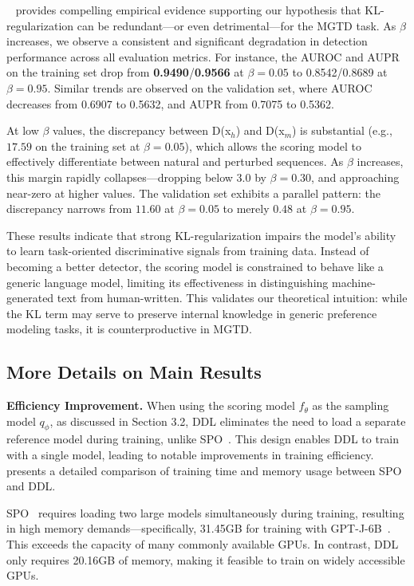 \documentclass[sigconf, screen, review, anonymous]{acmart}
\begin{document}
~ provides compelling empirical evidence supporting our hypothesis that KL-regularization can be redundant—or even detrimental—for the MGTD task. As $\beta$ increases, we observe a consistent and significant degradation in detection performance across all evaluation metrics. For instance, the AUROC and AUPR on the training set drop from \textbf{0.9490}/\textbf{0.9566} at $\beta=0.05$ to 0.8542/0.8689 at $\beta=0.95$. Similar trends are observed on the validation set, where AUROC decreases from 0.6907 to 0.5632, and AUPR from 0.7075 to 0.5362.

At low $\beta$ values, the discrepancy between D(x$_h$) and D(x$_m$) is substantial (e.g., $17.59$ on the training set at $\beta=0.05$), which allows the scoring model to effectively differentiate between natural and perturbed sequences. As $\beta$ increases, this margin rapidly collapses—dropping below $3.0$ by $\beta=0.30$, and approaching near-zero at higher values. The validation set exhibits a parallel pattern: the discrepancy narrows from $11.60$ at $\beta=0.05$ to merely $0.48$ at $\beta=0.95$.

These results indicate that strong KL-regularization impairs the model's ability to learn task-oriented discriminative signals from training data. Instead of becoming a better detector, the scoring model is constrained to behave like a generic language model, limiting its effectiveness in distinguishing machine-generated text from human-written. This validates our theoretical intuition: while the KL term may serve to preserve internal knowledge in generic preference modeling tasks, it is counterproductive in MGTD.

\subsection{More Details on Main Results}
\noindent \textbf{Efficiency Improvement. }
When using the scoring model $f_\theta$ as the sampling model $q_\phi$, as discussed in Section 3.2, DDL eliminates the need to load a separate reference model during training, unlike SPO~\cite{imbd}.
% 
This design enables DDL to train with a single model, leading to notable improvements in training efficiency.
% 
 presents a detailed comparison of training time and memory usage between SPO~\cite{imbd} and DDL.

SPO~\cite{imbd} requires loading two large models simultaneously during training, resulting in high memory demands—specifically, 31.45GB for training with GPT-J-6B~\cite{gpt-j}. This exceeds the capacity of many commonly available GPUs.
% 
In contrast, DDL only requires 20.16GB of memory, making it feasible to train on widely accessible GPUs.
\end{document}
